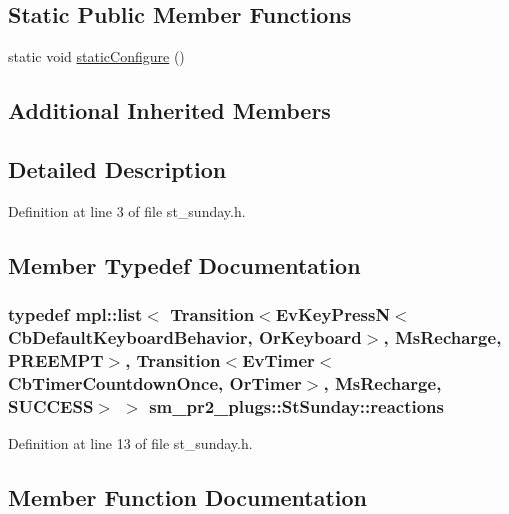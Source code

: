 \subsection*{Static Public Member Functions}
\begin{DoxyCompactItemize}
\item 
static void \hyperlink{structsm__pr2__plugs_1_1StSunday_a9875542a27afa3b7444390a3d1a59400}{static\+Configure} ()
\end{DoxyCompactItemize}
\subsection*{Additional Inherited Members}


\subsection{Detailed Description}


Definition at line 3 of file st\+\_\+sunday.\+h.



\subsection{Member Typedef Documentation}
\subsubsection[{\texorpdfstring{reactions}{reactions}}]{\setlength{\rightskip}{0pt plus 5cm}typedef mpl\+::list$<$ Transition$<$Ev\+Key\+PressN$<$Cb\+Default\+Keyboard\+Behavior, {\bf Or\+Keyboard}$>$, {\bf Ms\+Recharge}, {\bf P\+R\+E\+E\+M\+PT}$>$, Transition$<$Ev\+Timer$<$Cb\+Timer\+Countdown\+Once, {\bf Or\+Timer}$>$, {\bf Ms\+Recharge}, {\bf S\+U\+C\+C\+E\+SS}$>$ $>$ {\bf sm\+\_\+pr2\+\_\+plugs\+::\+St\+Sunday\+::reactions}}\hypertarget{structsm__pr2__plugs_1_1StSunday_ad110ae99c0cba95e61fef65e59453894}{}\label{structsm__pr2__plugs_1_1StSunday_ad110ae99c0cba95e61fef65e59453894}


Definition at line 13 of file st\+\_\+sunday.\+h.



\subsection{Member Function Documentation}
